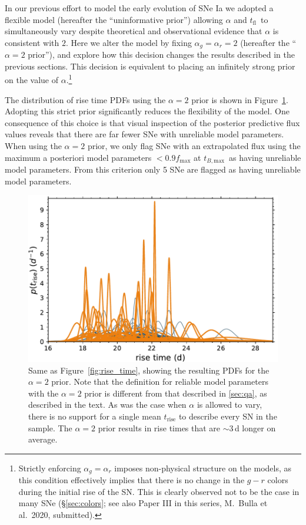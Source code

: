 \documentclass[twocolumn]{./aastex63}
\newcommand{\tfl}{$t_\mathrm{fl}$}
\newcommand{\tbmax}{$t_{B,\mathrm{max}}$}
\begin{document}
In our previous effort to model the early evolution of SNe Ia we adopted a
flexible model (hereafter the ``uninformative prior'') allowing $\alpha$ and
\tfl\ to simultaneously vary despite theoretical \citep{Arnett82,Riess99a} and
observational \citep{Conley06,Hayden10,Ganeshalingam11} evidence that $\alpha$
is consistent with $2$. Here we alter the model by fixing $\alpha_g = \alpha_r
= 2$ (hereafter the ``$\alpha = 2$ prior''), and explore how this decision
changes the results described in the previous sections. This decision is
equivalent to placing an infinitely strong prior on the value of
$\alpha$.\footnote{Strictly enforcing $\alpha_g = \alpha_r$ imposes
non-physical structure on the models, as this condition effectively implies
that there is no change in the $g - r$ colors during the initial rise of the
SN. This is clearly observed not to be the case in many SNe
(\S\ref{sec:colors}; see also Paper III in this series, M.~Bulla et al.\ 2020,
submitted).}

The distribution of rise time PDFs using the $\alpha = 2$ prior is shown in
Figure~\ref{fig:tsquared_rise}. Adopting this strict prior significantly
reduces the flexibility of the model. One consequence of this choice is that
visual inspection of the posterior predictive flux values reveals that there
are far fewer SNe with unreliable model parameters. When using the $\alpha =
2$ prior, we only flag SNe with an extrapolated flux using the maximum
a posteriori model parameters $< 0.9 f_\mathrm{max}$ at \tbmax\ as having
unreliable model parameters. From this criterion only 5 SNe are flagged as
having unreliable model parameters.

\begin{figure}
    \centering
    \includegraphics[width=1\linewidth]{./figures/tsquared_rise_time.pdf}
    \caption{Same as Figure~\ref{fig:rise_time}, showing the resulting PDFs for
    the $\alpha = 2$ prior. Note that the definition for reliable model
    parameters with the $\alpha = 2$ prior is different from that described in
    \ref{sec:qa}, as described in the text. As was the case when $\alpha$ is
    allowed to vary, there is no support for a single mean $t_\mathrm{rise}$ to
    describe every SN in the sample. The $\alpha = 2$ prior results in rise
    times that are $\sim$3\,d longer on average.}
    \label{fig:tsquared_rise}
\end{figure}
\end{document}
